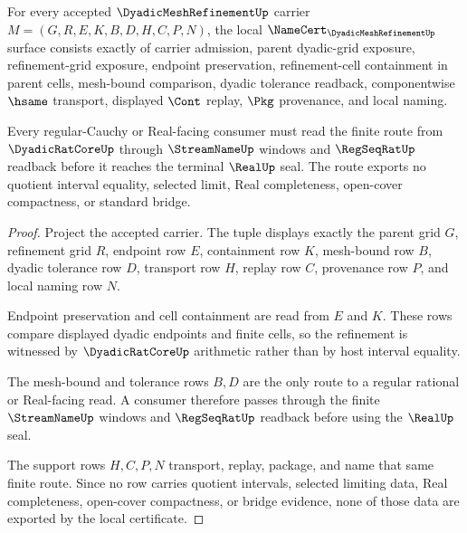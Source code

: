\begin{theorem}
\label{thm:dyadic-mesh-refinement-namecert-obligations}
For every accepted $\DyadicMeshRefinementUp$ carrier $M=(G,R,E,K,B,D,H,C,P,N)$, the local $\NameCert_{\DyadicMeshRefinementUp}$ surface consists exactly of carrier admission, parent dyadic-grid exposure, refinement-grid exposure, endpoint preservation, refinement-cell containment in parent cells, mesh-bound comparison, dyadic tolerance readback, componentwise $\hsame$ transport, displayed $\Cont$ replay, $\Pkg$ provenance, and local naming.

Every regular-Cauchy or Real-facing consumer must read the finite route from $\DyadicRatCoreUp$ through $\StreamNameUp$ windows and $\RegSeqRatUp$ readback before it reaches the terminal $\RealUp$ seal. The route exports no quotient interval equality, selected limit, Real completeness, open-cover compactness, or standard bridge.
\end{theorem}
\begin{proof}
Project the accepted carrier. The tuple displays exactly the parent grid $G$, refinement grid $R$, endpoint row $E$, containment row $K$, mesh-bound row $B$, dyadic tolerance row $D$, transport row $H$, replay row $C$, provenance row $P$, and local naming row $N$.

Endpoint preservation and cell containment are read from $E$ and $K$. These rows compare displayed dyadic endpoints and finite cells, so the refinement is witnessed by $\DyadicRatCoreUp$ arithmetic rather than by host interval equality.

The mesh-bound and tolerance rows $B,D$ are the only route to a regular rational or Real-facing read. A consumer therefore passes through the finite $\StreamNameUp$ windows and $\RegSeqRatUp$ readback before using the $\RealUp$ seal.

The support rows $H,C,P,N$ transport, replay, package, and name that same finite route. Since no row carries quotient intervals, selected limiting data, Real completeness, open-cover compactness, or bridge evidence, none of those data are exported by the local certificate.
\end{proof}

